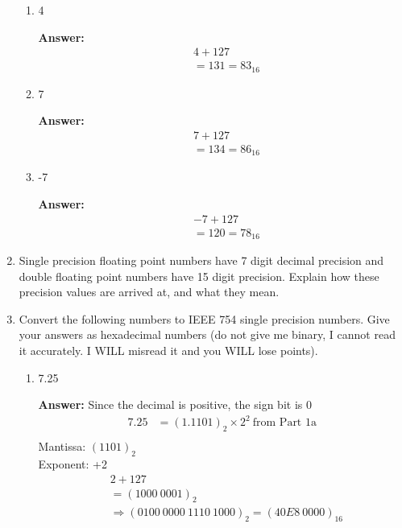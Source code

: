 \documentclass[12pt]{article}
\begin{document}
\begin{enumerate}
\begin{enumerate}
      \item 4

      \textbf{Answer:}
      \begin{align*}
        &4 + 127 \\
        &= 131 = 83_{16}
      \end{align*}

      \setcounter{enumii}{3}
      \item 7

      \textbf{Answer:}
      \begin{align*}
        &7 + 127 \\
        &= 134 = 86_{16}
      \end{align*}

      \item -7

      \textbf{Answer:}
      \begin{align*}
        &-7 + 127 \\
        &= 120 = 78_{16}
      \end{align*}

    \end{enumerate}

    \setcounter{enumi}{7}
    \item Single precision floating point numbers have 7 digit decimal precision and double floating point numbers have 15 digit precision. Explain how these precision values are arrived at, and what they mean.

    \item Convert the following numbers to IEEE 754 single precision numbers. Give your answers as hexadecimal numbers (do not give me binary, I cannot read it accurately. I WILL misread it and you WILL lose points).
    \begin{enumerate}
      \item 7.25

      \textbf{Answer:}
      Since the decimal is positive, the sign bit is 0
      \begin{align*}
        7.25 &= (1.1101)_2 \times 2^{2} \ \text{from Part 1a}\\
      \end{align*}
      Mantissa: $(1101)_2$ \\
      Exponent: +2
      \begin{align*}
        &2 + 127 \\
        &= (1000 \ 0001)_2 \\
        &\Rightarrow (0100 \ 0000 \ 1110 \ 1000)_2 = (40E8 \ 0000)_{16}
      \end{align*}


\end{enumerate}
\end{enumerate}
\end{document}
